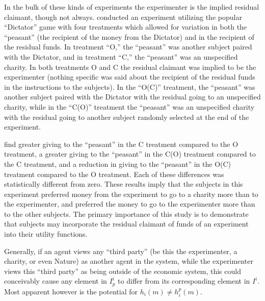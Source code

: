 \documentclass[../main.tex]{subfiles}
\begin{document}
In the bulk of these kinds of experiments the experimenter is the implied residual claimant, though not always.
\textcite{Harrison2006} conducted an experiment utilizing the popular \enquote{Dictator} game with four treatments which allowed for variation in both the \enquote{peasant} (the recipient of the money from the Dictator) and in the recipient of the residual funds.
In treatment \enquote{O,} the \enquote{peasant} was another subject paired with the Dictator, and in treatment \enquote{C,} the \enquote{peasant} was an unspecified charity.
In both treatments O and C the residual claimant was implied to be the experimenter (nothing specific was said about the recipient of the residual funds in the instructions to the subjects).
In the \enquote{O(C)} treatment, the \enquote{peasant} was another subject paired with the Dictator with the residual going to an unspecified charity, while in the \enquote{C(O)} treatment the \enquote{peasant} was an unspecified charity with the residual going to another subject randomly selected at the end of the experiment.

\textcite[196]{Harrison2006} find greater giving to the \enquote{peasant} in the C treatment compared to the O treatment, a greater giving to the \enquote{peasant} in the C(O) treatment compared to the C treatment, and a reduction in giving to the \enquote{peasant} in the O(C) treatment compared to the O treatment.
Each of these differences was statistically different from zero.
These results imply that the subjects in this experiment preferred money from the experiment to go to a charity more than to the experimenter, and preferred the money to go to the experimenter more than to the other subjects.
The primary importance of this study is to demonstrate that subjects may incorporate the residual claimant of funds of an experiment into their utility functions. 

Generally, if an agent views any \enquote{third party} (be this the experimenter, a charity, or even Nature) as another agent in the system, while the experimenter views this \enquote{third party} as being outside of the economic system, this could conceivably cause any element in $I^i_p$ to differ from its corresponding element in $I^i$.
Most apparent however is the potential for $h_i(m) \neq h_i^p(m)$.
\end{document}
